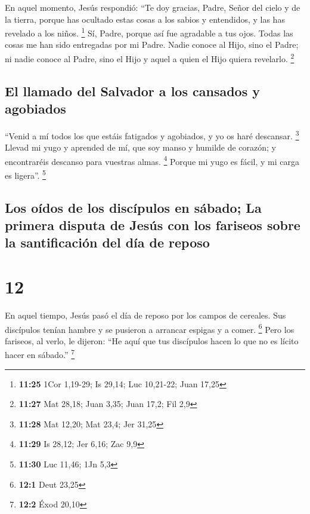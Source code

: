  En aquel momento, Jesús respondió: ``Te doy gracias,
Padre, Señor del cielo y de la tierra, porque has ocultado estas cosas a
los sabios y entendidos, y las has revelado a los niños. \footnote{\textbf{11:25}
  1Cor 1,19-29; Is 29,14; Luc 10,21-22; Juan 17,25}  Sí,
Padre, porque así fue agradable a tus ojos.  Todas las
cosas me han sido entregadas por mi Padre. Nadie conoce al Hijo, sino el
Padre; ni nadie conoce al Padre, sino el Hijo y aquel a quien el Hijo
quiera revelarlo. \footnote{\textbf{11:27} Mat 28,18; Juan 3,35; Juan
  17,2; Fil 2,9}

\hypertarget{el-llamado-del-salvador-a-los-cansados-y-agobiados}{%
\subsection{El llamado del Salvador a los cansados
\hspace{0pt}\hspace{0pt}y
agobiados}\label{el-llamado-del-salvador-a-los-cansados-y-agobiados}}

 ``Venid a mí todos los que estáis fatigados y agobiados,
y yo os haré descansar. \footnote{\textbf{11:28} Mat 12,20; Mat 23,4;
  Jer 31,25}  Llevad mi yugo y aprended de mí, que soy
manso y humilde de corazón; y encontraréis descanso para vuestras almas.
\footnote{\textbf{11:29} Is 28,12; Jer 6,16; Zac 9,9} 
Porque mi yugo es fácil, y mi carga es ligera''. \footnote{\textbf{11:30}
  Luc 11,46; 1Jn 5,3}

\hypertarget{los-ouxeddos-de-los-discuxedpulos-en-suxe1bado-la-primera-disputa-de-jesuxfas-con-los-fariseos-sobre-la-santificaciuxf3n-del-duxeda-de-reposo}{%
\subsection{Los oídos de los discípulos en sábado; La primera disputa de
Jesús con los fariseos sobre la santificación del día de
reposo}\label{los-ouxeddos-de-los-discuxedpulos-en-suxe1bado-la-primera-disputa-de-jesuxfas-con-los-fariseos-sobre-la-santificaciuxf3n-del-duxeda-de-reposo}}

\hypertarget{section-11}{%
\section{12}\label{section-11}}

 En aquel tiempo, Jesús pasó el día de reposo por los
campos de cereales. Sus discípulos tenían hambre y se pusieron a
arrancar espigas y a comer. \footnote{\textbf{12:1} Deut 23,25}
 Pero los fariseos, al verlo, le dijeron: ``He aquí que
tus discípulos hacen lo que no es lícito hacer en sábado.'' \footnote{\textbf{12:2}
  Éxod 20,10}

